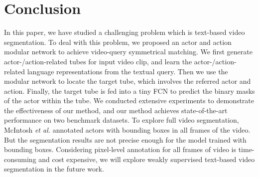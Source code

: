 \documentclass[journal]{IEEEtran}
\begin{document}
\section{Conclusion}
In this paper, we have studied a challenging problem which is text-based video segmentation. To deal with this problem, we proposed an actor and action modular network to achieve video-query symmetrical matching. We first generate actor-/action-related tubes for input video clip, and learn the actor-/action-related language representations from the textual query. Then we use the modular network to locate the target tube, which involves the referred actor and action. Finally, the target tube is fed into a tiny FCN to predict the binary masks of the actor within the tube. We conducted extensive experiments to demonstrate the effectiveness of our method, and our method achieves state-of-the-art performance on two benchmark datasets. To explore full video segmentation, McIntosh \emph{et al.} annotated actors with bounding boxes in all frames of the video. But the segmentation results are not precise enough for the model trained with bounding boxes. Considering pixel-level annotation for all frames of video is time-consuming and cost expensive, we will explore weakly supervised text-based video segmentation in the future work.













\ifCLASSOPTIONcaptionsoff
  \newpage
\fi









\end{document}

